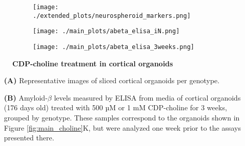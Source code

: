 \begin{figure}[H]
    \begin{subfigure}[t]{0.7\textwidth}
        \caption{}
        \texttt{[image: ./extended\_plots/neurospheroid\_markers.png]}        
    \end{subfigure}
    \par
    \begin{subfigure}[t]{0.5\textwidth}
        \caption{}
        \texttt{[image: ./main\_plots/abeta\_elisa\_iN.png]}        
    \end{subfigure}     
    \par
    \begin{subfigure}[t]{0.7\textwidth}
        \caption{}
        \texttt{[image: ./main\_plots/abeta\_elisa\_3weeks.png]}        
    \end{subfigure}
    \caption{
        \textbf{CDP-choline treatment in cortical organoids}\\
    }
    \label{fig:neurospheroid_figure}
\end{figure}
\begin{itemize}
    \item[\textbf{(A)}] Representative images of sliced cortical organoids per genotype. 
    \item[\textbf{(B)}] Amyloid-$\beta$ levels measured by ELISA from media of cortical organoids (176 days old) treated with 500 µM or 1 mM CDP-choline for 3 weeks, grouped by genotype. These samples correspond to the organoids shown in Figure \ref{fig:main_choline}K, but were analyzed one week prior to the assays presented there.\end{itemize}